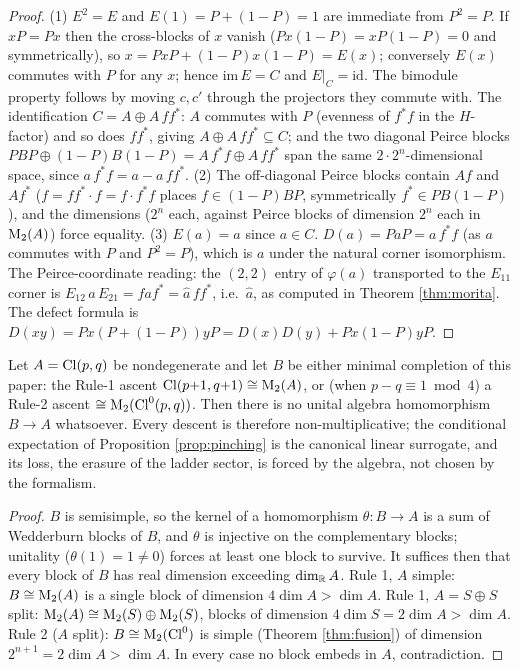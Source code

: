 \begin{proof}
(1) $E^2 = E$ and $E(1) = P + (1-P) = 1$ are immediate from $P^2 = P$. If $xP = Px$ then the cross-blocks of $x$ vanish ($Px(1-P) = xP(1-P) = 0$ and symmetrically), so $x = PxP + (1-P)x(1-P) = E(x)$; conversely $E(x)$ commutes with $P$ for any $x$; hence $\mathrm{im}\,E = C$ and $E|_C = \mathrm{id}$. The bimodule property follows by moving $c, c'$ through the projectors they commute with. The identification $C = A \oplus A\,ff^*$: $A$ commutes with $P$ (evenness of $f^*f$ in the $H$-factor) and so does $ff^*$, giving $A \oplus A\,ff^* \subseteq C$; and the two diagonal Peirce blocks $PBP \oplus (1-P)B(1-P) = A\,f^*f \oplus A\,ff^*$ span the same $2 \cdot 2^n$-dimensional space, since $a\,f^*f = a - a\,ff^*$. (2) The off-diagonal Peirce blocks contain $Af$ and $Af^*$ ($f = ff^*\cdot f = f \cdot f^*f$ places $f \in (1-P)BP$, symmetrically $f^* \in PB(1-P)$), and the dimensions ($2^n$ each, against Peirce blocks of dimension $2^n$ each in $\mathrm{M}_2(A)$) force equality. (3) $E(a) = a$ since $a \in C$. $D(a) = P a P = a\,f^*f$ (as $a$ commutes with $P$ and $P^2 = P$), which is $a$ under the natural corner isomorphism. The Peirce-coordinate reading: the $(2,2)$ entry of $\varphi(a)$ transported to the $E_{11}$ corner is $E_{12}\,a\,E_{21} = f a f^* = \hat{a}\,ff^*$, i.e.\ $\hat{a}$, as computed in Theorem \ref{thm:morita}. The defect formula is $D(xy) = Px(P + (1-P))yP = D(x)D(y) + Px(1-P)yP$.
\end{proof}

\begin{theorem}\label{thm:oneway}
Let $A = \mathrm{Cl}(p,q)$ be nondegenerate and let $B$ be either minimal completion of this paper: the Rule-1 ascent $\mathrm{Cl}(p{+}1,q{+}1) \cong \mathrm{M}_2(A)$, or (when $p - q \equiv 1 \bmod 4$) a Rule-2 ascent $\cong \mathrm{M}_2(\mathrm{Cl}^0(p,q))$. Then there is no unital algebra homomorphism $B \to A$ whatsoever. Every descent is therefore non-multiplicative; the conditional expectation of Proposition \ref{prop:pinching} is the canonical linear surrogate, and its loss, the erasure of the ladder sector, is forced by the algebra, not chosen by the formalism.
\end{theorem}

\begin{proof}
$B$ is semisimple, so the kernel of a homomorphism $\theta : B \to A$ is a sum of Wedderburn blocks of $B$, and $\theta$ is injective on the complementary blocks; unitality ($\theta(1) = 1 \neq 0$) forces at least one block to survive. It suffices then that every block of $B$ has real dimension exceeding $\dim_{\mathbb{R}} A$. Rule 1, $A$ simple: $B \cong \mathrm{M}_2(A)$ is a single block of dimension $4 \dim A > \dim A$. Rule 1, $A = S \oplus S$ split: $\mathrm{M}_2(A) \cong \mathrm{M}_2(S) \oplus \mathrm{M}_2(S)$, blocks of dimension $4 \dim S = 2 \dim A > \dim A$. Rule 2 ($A$ split): $B \cong \mathrm{M}_2(\mathrm{Cl}^0)$ is simple (Theorem \ref{thm:fusion}) of dimension $2^{n+1} = 2\dim A > \dim A$. In every case no block embeds in $A$, contradiction.
\end{proof}

